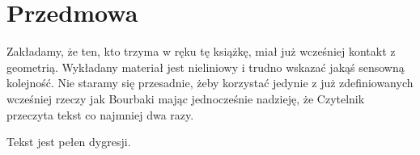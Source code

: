 \documentclass{greaseproofita}
\begin{document}
% 

\tableofcontents

\chapter*{Przedmowa}
Zakładamy, że ten, kto trzyma w ręku tę książkę, miał już wcześniej kontakt z geometrią.
Wykładany materiał jest nieliniowy i trudno wskazać jakąś sensowną kolejność.
Nie staramy się przesadnie, żeby korzystać jedynie z już zdefiniowanych wcześniej rzeczy jak Bourbaki mając jednocześnie nadzieję, że Czytelnik przeczyta tekst co najmniej dwa razy.

Tekst jest pełen dygresji.


\appendix


% 
% 
% 
% 

{}


\raggedright
{}
\printindex

\printindex[persons]
\end{document}
